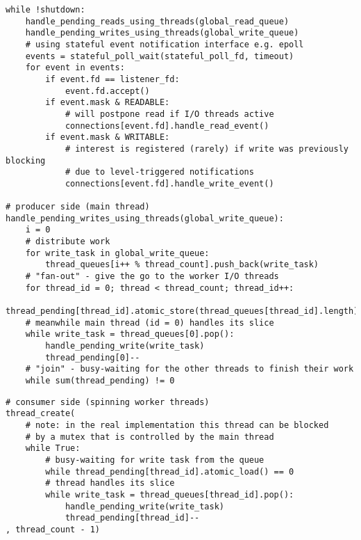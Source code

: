 \begin{lstlisting}
while !shutdown:
    handle_pending_reads_using_threads(global_read_queue)
    handle_pending_writes_using_threads(global_write_queue)
    # using stateful event notification interface e.g. epoll
    events = stateful_poll_wait(stateful_poll_fd, timeout)
    for event in events:
        if event.fd == listener_fd:
            event.fd.accept()
        if event.mask & READABLE:
            # will postpone read if I/O threads active
            connections[event.fd].handle_read_event()
        if event.mask & WRITABLE:
            # interest is registered (rarely) if write was previously blocking
            # due to level-triggered notifications
            connections[event.fd].handle_write_event()

# producer side (main thread)
handle_pending_writes_using_threads(global_write_queue):
    i = 0
    # distribute work
    for write_task in global_write_queue:
        thread_queues[i++ % thread_count].push_back(write_task)
    # "fan-out" - give the go to the worker I/O threads
    for thread_id = 0; thread < thread_count; thread_id++:
        thread_pending[thread_id].atomic_store(thread_queues[thread_id].length)
    # meanwhile main thread (id = 0) handles its slice
    while write_task = thread_queues[0].pop():
        handle_pending_write(write_task)
        thread_pending[0]--
    # "join" - busy-waiting for the other threads to finish their work
    while sum(thread_pending) != 0
\end{lstlisting}
\pagebreak
\begin{lstlisting}
# consumer side (spinning worker threads)
thread_create(
    # note: in the real implementation this thread can be blocked
    # by a mutex that is controlled by the main thread
    while True:
        # busy-waiting for write task from the queue
        while thread_pending[thread_id].atomic_load() == 0
        # thread handles its slice
        while write_task = thread_queues[thread_id].pop():
            handle_pending_write(write_task)
            thread_pending[thread_id]--
, thread_count - 1)
\end{lstlisting}
